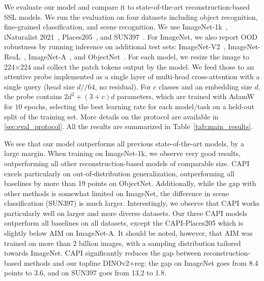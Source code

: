 We evaluate our model and compare it to state-of-the-art reconstruction-based SSL models.
We run the evaluation on four datasets including object recognition, fine-grained classification, and scene recognition.
We use ImageNet-1k~\citep{russakovsky2015imagenet}, iNaturalist 2021~\citep{van2021benchmarking}, Places205~\citep{zhou2017scene}, and SUN397~\citep{xiao2010sun}.
For ImageNet, we also report OOD robustness by running inference on additional test sets:
ImageNet-V2~\citep{recht2019imagenet}, ImageNet-ReaL~\citep{beyer2020imagenetreal}, ImageNet-A~\citep{hendrycks2021natural}, and ObjectNet~\citep{barbu2019objectnet}.
For each model, we resize the image to 224$\times$224 and collect the patch tokens output by the model.
We feed those to an attentive probe implemented as a single layer of multi-head cross-attention with a single query (head size $d//64$, no residual).
For $c$ classes and an embedding size $d$, the probe contains $2d^2 + (3+c)d$ parameters, which are trained with AdamW for $10$ epochs, selecting the best learning rate for each model/task on a held-out split of the training set.
More details on the protocol are available in \cref{sec:eval_protocol}.
All the results are summarized in Table~\ref{tab:main_results}.

We see that our model outperforms all previous state-of-the-art models, by a large margin.
When training on ImageNet-1k, we observe very good results, outperforming all other reconstruction-based models of comparable size.
CAPI excels particularly on out-of-distribution generalization, outperforming all baselines by more than 19 points on ObjectNet.
Additionally, while the gap with other methods is somewhat limited on ImageNet, the difference in scene classification (SUN397) is much larger.
Interestingly, we observe that CAPI works particularly well on larger and more diverse datasets.
Our three CAPI models outperform all baselines on all datasets, except the CAPI-Places205 which is slightly below AIM on ImageNet-A.
It should be noted, however, that AIM was trained on more than 2 billion images, with a sampling distribution tailored towards ImageNet.
CAPI significantly reduces the gap between reconstruction-based methods and our topline DINOv2+reg: the gap on ImageNet goes from 8.4 points to 3.6, and on SUN397 goes from 13.2 to 1.8.


